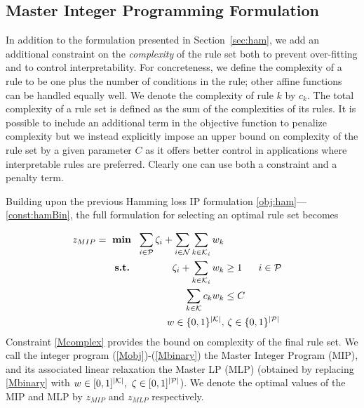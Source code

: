 \documentclass[twoside,11pt]{article}
\begin{document}
\subsection{Master Integer Programming Formulation}

In addition to the formulation presented in Section~\ref{sec:ham}, we add an additional constraint on the {\em complexity} of the rule set both to prevent over-fitting and to control interpretability. For concreteness, we define the complexity of a rule to be one plus the number of conditions in the rule; other affine functions %
can be handled equally well. We denote the complexity of rule $k$ by $c_k$. The total complexity of a rule set is defined as the sum of the complexities of its rules.
It is possible to include an additional term in the objective function to penalize complexity but we instead explicitly impose an upper bound on complexity of the rule set by a given parameter $C$ as it offers better control in applications where interpretable rules are preferred. Clearly one can use both a constraint and a penalty term.

Building upon the previous Hamming loss IP formulation \eqref{obj:ham}---\eqref{const:hamBin}, the full formulation for selecting an optimal rule set becomes
	
	\begin{align}
	z_{MIP} = ~\textbf{min} ~~\sum_{i \in \mathcal{P}} \zeta_i + \sum_{i \in \mathcal{N}} \sum_{k \in \mathcal{K}_i} w_k \label{Mobj}\\
	\textbf{s.t.}~\qquad\qquad  \zeta_i + \sum_{k \in \mathcal{K}_i} w_k &\geq 1 ~~~~~i \in \mathcal{P} \label{MmisP}\\
	\sum_{k \in \mathcal{K}} c_k w_k &\leq C \label{Mcomplex}\\
	w\in \{0,1\}^{\lvert\mathcal{K}\rvert},&~ \zeta\in \{0,1\}^{\lvert\mathcal{P}\rvert}  \label{Mbinary}
	\end{align}
%
Constraint \eqref{Mcomplex} provides the bound on complexity of the final rule set. We call the integer program (\ref{Mobj})-(\ref{Mbinary}) the Master Integer Program (MIP), and its associated linear relaxation the Master LP (MLP) (obtained by replacing \eqref{Mbinary} with $w\in [0,1]^{\lvert\mathcal{K}\rvert},~ \zeta\in [0,1]^{\lvert\mathcal{P}\rvert}$). We denote the optimal values of the MIP and MLP by $z_{MIP}$ and $z_{MLP}$ respectively. 
\end{document}
